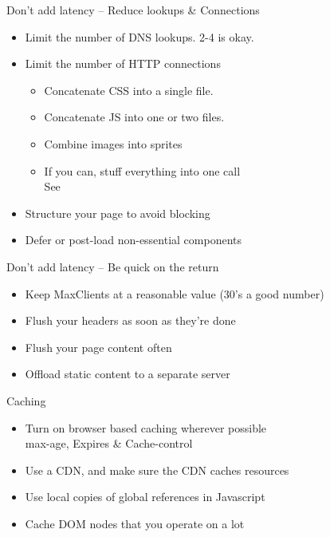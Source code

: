 \documentclass{beamer}
\begin{document}
\begin{frame}{Don't add latency -- Reduce lookups \& Connections}
  \begin{itemize}
  \item Limit the number of DNS lookups.  2-4 is okay.
  \item Limit the number of HTTP connections
    \begin{itemize}
    \item Concatenate CSS into a single file.
    \item Concatenate JS into one or two files.
    \item Combine images into sprites
    \item If you can, stuff everything into one call \\
          \footnotesize{See \href{http://search.yahoo.com/}{}}
    \end{itemize}
  \item Structure your page to avoid blocking
  \item Defer or post-load non-essential components
  \end{itemize}
\end{frame}

\begin{frame}{Don't add latency -- Be quick on the return}
  \begin{itemize}
  \item Keep MaxClients at a reasonable value (30's a good number)
  \item Flush your headers as soon as they're done
  \item Flush your page content often
  \item Offload static content to a separate server
  \end{itemize}
\end{frame}

\begin{frame}{Caching}
  \begin{itemize}
  \item Turn on browser based caching wherever possible \\
        \footnotesize{max-age, Expires \& Cache-control}
  \item Use a CDN, and make sure the CDN caches resources
  \item Use local copies of global references in Javascript
  \item Cache DOM nodes that you operate on a lot
  \end{itemize}
\end{frame}
\end{document}
